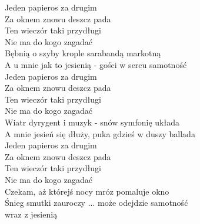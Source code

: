 
Jeden papieros za drugim \tab{}\tab{}\\
Za oknem znowu deszcz pada \tab{}\tab{}\\
Ten wieczór taki przydługi \tab{}\tab{}\\
Nie ma do kogo zagadać \tab{}\tab{}\\
Bębnią o szyby krople sarabandą markotną \tab{} \\
A u mnie jak to jesienią - gości w sercu samotność \\
\hops
Jeden papieros za drugim \\
Za oknem znowu deszcz pada \\
Ten wieczór taki przydługi \\
Nie ma do kogo zagadać \\
Wiatr dyrygent i muzyk - snów symfonię układa \\
A mnie jesień się dłuży, puka gdzieś w duszy ballada \\
\hops
Jeden papieros za drugim \\
Za oknem znowu deszcz pada \\
Ten wieczór taki przydługi \\
Nie ma do kogo zagadać \\
Czekam, aż którejś nocy mróz pomaluje okno \\
Śnieg smutki zauroczy ... może odejdzie samotność \\
wraz z jesienią \tab {} \tab{} \tab{} 